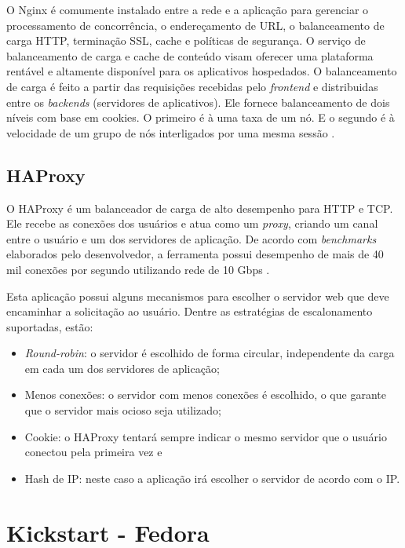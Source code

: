 O Nginx é comumente instalado entre a rede e a aplicação para gerenciar o processamento de concorrência, o endereçamento de URL, o balanceamento de carga HTTP, terminação SSL, cache e políticas de segurança. O serviço de balanceamento de carga e cache de conteúdo visam oferecer uma plataforma rentável e altamente disponível para os aplicativos hospedados. O balanceamento de carga é feito a partir das requisições recebidas pelo \textit{frontend} e distribuidas entre os \textit{backends} (servidores de aplicativos). Ele fornece balanceamento de dois níveis com base em cookies. O primeiro é à uma taxa de um nó. E o segundo é à velocidade de um grupo de nós interligados por uma mesma sessão \cite{Jelastic2014}.


\subsection{HAProxy}

O HAProxy é um balanceador de carga de alto desempenho para HTTP e TCP. Ele recebe as conexões dos usuários e atua como um \textit{proxy}, criando um canal entre o usuário e um dos servidores de aplicação. De acordo com \textit{benchmarks} elaborados pelo desenvolvedor, a ferramenta possui desempenho de mais de 40 mil conexões por segundo utilizando rede de 10 Gbps \cite{HAProxy2009}.

Esta aplicação possui alguns mecanismos para escolher o servidor web que deve encaminhar a solicitação ao usuário. Dentre as estratégias de escalonamento suportadas, estão:

\begin{itemize}
\item \textit{Round-robin}: o servidor é escolhido de forma circular, independente da carga em cada um dos servidores de aplicação;
\item Menos conexões: o servidor com menos conexões é escolhido, o que garante que o servidor mais ocioso seja utilizado;
\item Cookie: o HAProxy tentará sempre indicar o mesmo servidor que o usuário conectou pela primeira vez e
\item Hash de IP: neste caso a aplicação irá escolher o servidor de acordo com o IP.
\end{itemize}

\section{Kickstart - Fedora}

